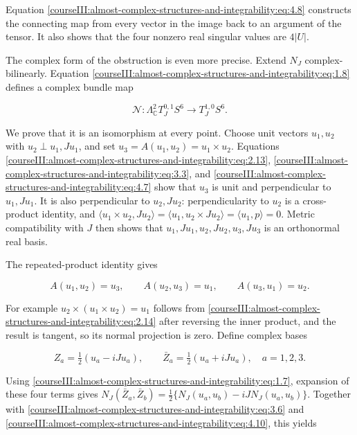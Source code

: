 Equation \eqref{courseIII:almost-complex-structures-and-integrability:eq:4.8} constructs the connecting map from every vector in the image back to an argument of the tensor. It also shows that the four nonzero real singular values are \(4|U|\).

The complex form of the obstruction is even more precise. Extend \(N_J\) complex-bilinearly. Equation \eqref{courseIII:almost-complex-structures-and-integrability:eq:1.8} defines a complex bundle map

\begin{equation}
\mathscr N:\Lambda^2_{\mathbb C}T^{0,1}_JS^6
\longrightarrow T^{1,0}_JS^6.
\label{courseIII:almost-complex-structures-and-integrability:eq:4.9}
\end{equation}

We prove that it is an isomorphism at every point. Choose unit vectors \(u_1,u_2\) with \(u_2\perp u_1,Ju_1\), and set \(u_3=A(u_1,u_2)=u_1\times u_2\). Equations \eqref{courseIII:almost-complex-structures-and-integrability:eq:2.13}, \eqref{courseIII:almost-complex-structures-and-integrability:eq:3.3}, and \eqref{courseIII:almost-complex-structures-and-integrability:eq:4.7} show that \(u_3\) is unit and perpendicular to \(u_1,Ju_1\). It is also perpendicular to \(u_2,Ju_2\): perpendicularity to \(u_2\) is a cross-product identity, and
\(\langle u_1\times u_2,Ju_2\rangle=\langle u_1,u_2\times Ju_2\rangle=\langle u_1,p\rangle=0\).
Metric compatibility with \(J\) then shows that
\(u_1,Ju_1,u_2,Ju_2,u_3,Ju_3\) is an orthonormal real basis.

The repeated-product identity gives

\begin{equation}
A(u_1,u_2)=u_3,\qquad
A(u_2,u_3)=u_1,\qquad
A(u_3,u_1)=u_2.
\label{courseIII:almost-complex-structures-and-integrability:eq:4.10}
\end{equation}

For example \(u_2\times(u_1\times u_2)=u_1\) follows from \eqref{courseIII:almost-complex-structures-and-integrability:eq:2.14} after reversing the inner product, and the result is tangent, so its normal projection is zero. Define complex bases

\begin{equation}
Z_a=\tfrac12(u_a-iJu_a),\qquad
\bar Z_a=\tfrac12(u_a+iJu_a),\quad a=1,2,3.
\label{courseIII:almost-complex-structures-and-integrability:eq:4.11}
\end{equation}

Using \eqref{courseIII:almost-complex-structures-and-integrability:eq:1.7}, expansion of these four terms gives
\(N_J(\bar Z_a,\bar Z_b)=\frac12\{N_J(u_a,u_b)-iJN_J(u_a,u_b)\}\).
Together with \eqref{courseIII:almost-complex-structures-and-integrability:eq:3.6} and \eqref{courseIII:almost-complex-structures-and-integrability:eq:4.10}, this yields

